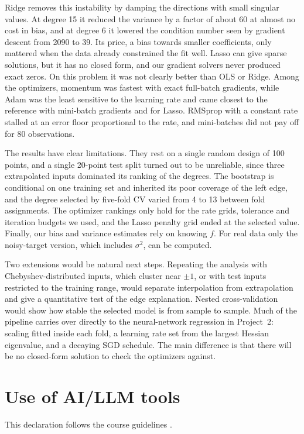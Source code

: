 \documentclass[aps,prb,reprint,superscriptaddress,nofootinbib,longbibliography,floatfix]{revtex4-2}
\begin{document}
Ridge removes this instability by damping the directions with small singular values. At degree 15 it reduced the variance by a factor of about 60 at almost no cost in bias, and at degree 6 it lowered the condition number seen by gradient descent from 2090 to 39. Its price, a bias towards smaller coefficients, only mattered when the data already constrained the fit well. Lasso can give sparse solutions, but it has no closed form, and our gradient solvers never produced exact zeros. On this problem it was not clearly better than OLS or Ridge. Among the optimizers, momentum was fastest with exact full-batch gradients, while Adam was the least sensitive to the learning rate and came closest to the reference with mini-batch gradients and for Lasso. RMSprop with a constant rate stalled at an error floor proportional to the rate, and mini-batches did not pay off for 80 observations.

The results have clear limitations. They rest on a single random design of 100 points, and a single 20-point test split turned out to be unreliable, since three extrapolated inputs dominated its ranking of the degrees. The bootstrap is conditional on one training set and inherited its poor coverage of the left edge, and the degree selected by five-fold CV varied from 4 to 13 between fold assignments. The optimizer rankings only hold for the rate grids, tolerance and iteration budgets we used, and the Lasso penalty grid ended at the selected value. Finally, our bias and variance estimates rely on knowing $f$. For real data only the noisy-target version, which includes $\sigma^2$, can be computed.

Two extensions would be natural next steps. Repeating the analysis with Chebyshev-distributed inputs, which cluster near $\pm1$, or with test inputs restricted to the training range, would separate interpolation from extrapolation and give a quantitative test of the edge explanation. Nested cross-validation would show how stable the selected model is from sample to sample. Much of the pipeline carries over directly to the neural-network regression in Project~2: scaling fitted inside each fold, a learning rate set from the largest Hessian eigenvalue, and a decaying SGD schedule. The main difference is that there will be no closed-form solution to check the optimizers against.

\appendix
\section{Use of AI/LLM tools}\label{app:llm}
This declaration follows the course guidelines \cite{LLMGuidelines2026}.
\end{document}
